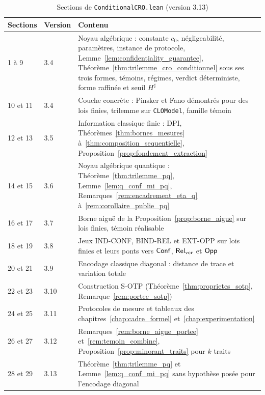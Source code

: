 \begin{table}[htbp]
\centering
\caption{Sections de \texttt{ConditionalCRO.lean} (version 3.13)}
\label{tab:lean4_sections}
\footnotesize
\begin{tabular}{@{}p{1.3cm}p{1.1cm}p{11.2cm}@{}}
\toprule
\textbf{Sections} & \textbf{Version} & \textbf{Contenu} \\
\midrule
1 \`a 9 & 3.4 & Noyau alg\'ebrique : constante $c_0$, n\'egligeabilit\'e, param\`etres, instance de protocole, Lemme~\ref{lem:confidentiality_guarantee}, Th\'eor\`eme~\ref{thm:trilemme_cro_conditionnel} sous ses trois formes, t\'emoins, r\'egimes, verdict d\'eterministe, forme raffin\'ee et seuil $H^\sharp$ \\
10 et 11 & 3.4 & Couche concr\`ete : Pinsker et Fano d\'emontr\'es pour des lois finies, trilemme sur \texttt{CLOModel}, famille t\'emoin \\
12 et 13 & 3.5 & Information classique finie : DPI, Th\'eor\`emes~\ref{thm:bornes_mesures} \`a~\ref{thm:composition_sequentielle}, Proposition~\ref{prop:fondement_extraction} \\
14 et 15 & 3.6 & Noyau alg\'ebrique quantique : Th\'eor\`eme~\ref{thm:trilemme_pq}, Lemme~\ref{lem:q_conf_mi_pq}, Remarques~\ref{rem:encadrement_eta_q} \`a~\ref{rem:corollaire_publie_pq} \\
16 et 17 & 3.7 & Borne aigu\"e de la Proposition~\ref{prop:borne_aigue} sur lois finies, t\'emoin r\'ealisable \\
18 et 19 & 3.8 & Jeux IND-CONF, BIND-REL et EXT-OPP sur lois finies et leurs ponts vers $\mathsf{Conf}$, $\mathsf{Rel}_{\mathrm{ver}}$ et $\mathsf{Opp}$ \\
20 et 21 & 3.9 & Encodage classique diagonal : distance de trace et variation totale \\
22 et 23 & 3.10 & Construction S-OTP (Th\'eor\`eme~\ref{thm:proprietes_sotp}, Remarque~\ref{rem:portee_sotp}) \\
24 et 25 & 3.11 & Protocoles de mesure et tableaux des chapitres~\ref{chap:cadre_formel} et~\ref{chap:experimentation} \\
26 et 27 & 3.12 & Remarques~\ref{rem:borne_aigue_portee} et~\ref{rem:temoin_combine}, Proposition~\ref{prop:minorant_traits} pour $k$ traits \\
28 et 29 & 3.13 & Th\'eor\`eme~\ref{thm:trilemme_pq} et Lemme~\ref{lem:q_conf_mi_pq} sans hypoth\`ese pos\'ee pour l'encodage diagonal \\
\bottomrule
\end{tabular}
\end{table}

